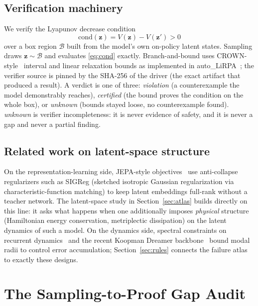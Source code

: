\documentclass[journal]{IEEEtran}
\newcommand{\zdyn}{\boldsymbol{z}}
\begin{document}
\subsection{Verification machinery}

We verify the Lyapunov decrease condition
\begin{equation}
  \mathrm{cond}(\zdyn) = V(\zdyn) - V(\zdyn') > 0
  \label{eq:cond}
\end{equation}
over a box region $\mathcal{B}$ built from the model's own on-policy latent
states. Sampling draws $\zdyn \sim \mathcal{B}$ and evaluates
\eqref{eq:cond} exactly. Branch-and-bound uses
CROWN-style~\cite{zhang2018crown} interval and linear relaxation bounds as
implemented in auto\_LiRPA~\cite{xu2020autolirpa}; the verifier source is
pinned by the SHA-256 of the driver (the exact artifact that produced a
result). A verdict is one of three: \emph{violation} (a counterexample the
model demonstrably reaches), \emph{certified} (the bound proves the condition
on the whole box), or \emph{unknown} (bounds stayed loose, no counterexample
found). \emph{unknown} is verifier incompleteness: it is never evidence of
safety, and it is never a gap and never a partial finding.

\subsection{Related work on latent-space structure}

On the representation-learning side, JEPA-style objectives~\cite{assran2023,
maes2026} use anti-collapse regularizers such as SIGReg (sketched isotropic
Gaussian regularization via characteristic-function matching) to keep latent
embeddings full-rank without a teacher network. The latent-space study in
Section~\ref{sec:atlas} builds directly on this line: it asks what happens
when one additionally imposes \emph{physical} structure (Hamiltonian energy
conservation, metriplectic dissipation) on the latent dynamics of such a
model. On the dynamics side, spectral constraints on recurrent
dynamics~\cite{miller2019} and the recent Koopman Dreamer
backbone~\cite{koopman2026} bound modal radii to control error accumulation;
Section~\ref{sec:rules} connects the failure atlas to exactly these designs.

\section{The Sampling-to-Proof Gap Audit}
\label{sec:audit}
\end{document}
